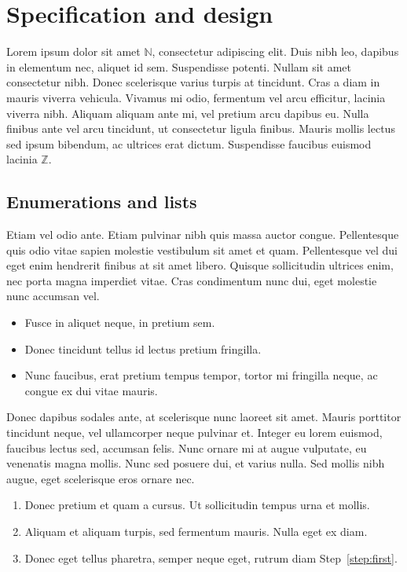 \chapter{Specification and design}
\label{ch:spec}

Lorem ipsum dolor sit amet $\mathbb{N}$, consectetur adipiscing elit. Duis nibh leo, dapibus in elementum nec, aliquet id sem. Suspendisse potenti. Nullam sit amet consectetur nibh. Donec scelerisque varius turpis at tincidunt. Cras a diam in mauris viverra vehicula. Vivamus mi odio, fermentum vel arcu efficitur, lacinia viverra nibh. Aliquam aliquam ante mi, vel pretium arcu dapibus eu. Nulla finibus ante vel arcu tincidunt, ut consectetur ligula finibus. Mauris mollis lectus sed ipsum bibendum, ac ultrices erat dictum. Suspendisse faucibus euismod lacinia $\mathbb{Z}$.


\section{Enumerations and lists}

Etiam vel odio ante. Etiam pulvinar nibh quis massa auctor congue. Pellentesque quis odio vitae sapien molestie vestibulum sit amet et quam. Pellentesque vel dui eget enim hendrerit finibus at sit amet libero. Quisque sollicitudin ultrices enim, nec porta magna imperdiet vitae. Cras condimentum nunc dui, eget molestie nunc accumsan vel.

\begin{itemize}
	\item Fusce in aliquet neque, in pretium sem.
	\item Donec tincidunt tellus id lectus pretium fringilla.
	\item Nunc faucibus, erat pretium tempus tempor, tortor mi fringilla neque, ac congue ex dui vitae mauris.
\end{itemize}

Donec dapibus sodales ante, at scelerisque nunc laoreet sit amet. Mauris porttitor tincidunt neque, vel ullamcorper neque pulvinar et. Integer eu lorem euismod, faucibus lectus sed, accumsan felis. Nunc ornare mi at augue vulputate, eu venenatis magna mollis. Nunc sed posuere dui, et varius nulla. Sed mollis nibh augue, eget scelerisque eros ornare nec.

\begin{enumerate}
	\item\label{step:first} Donec pretium et quam a cursus. Ut sollicitudin tempus urna et mollis.
	\item Aliquam et aliquam turpis, sed fermentum mauris. Nulla eget ex diam.
	\item Donec eget tellus pharetra, semper neque eget, rutrum diam Step~\ref{step:first}.
\end{enumerate}

